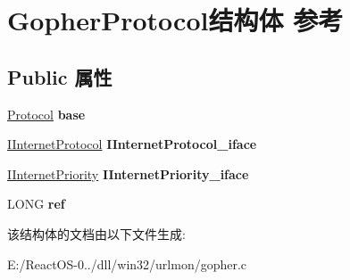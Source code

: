 \hypertarget{struct_gopher_protocol}{}\section{Gopher\+Protocol结构体 参考}
\label{struct_gopher_protocol}
\subsection*{Public 属性}
\begin{DoxyCompactItemize}
\item 
\mbox{\label{struct_gopher_protocol_a5ed7fc2daa0fad38d255bd0a5c42f15a}} 
\hyperlink{struct_protocol}{Protocol} {\bfseries base}
\item 
\mbox{\label{struct_gopher_protocol_af73eb5dea264e1be089a9da864a5d8ac}} 
\hyperlink{interface_i_internet_protocol}{I\+Internet\+Protocol} {\bfseries I\+Internet\+Protocol\+\_\+iface}
\item 
\mbox{\label{struct_gopher_protocol_ad61ecca1bc2ddf6b3eeb9ceb7c56ed85}} 
\hyperlink{interface_i_internet_priority}{I\+Internet\+Priority} {\bfseries I\+Internet\+Priority\+\_\+iface}
\item 
\mbox{\label{struct_gopher_protocol_abe7c3159e9ff344c29ff6fab8c77d164}} 
L\+O\+NG {\bfseries ref}
\end{DoxyCompactItemize}


该结构体的文档由以下文件生成\+:\begin{DoxyCompactItemize}
\item 
E\+:/\+React\+O\+S-\/0../dll/win32/urlmon/gopher.\+c\end{DoxyCompactItemize}
